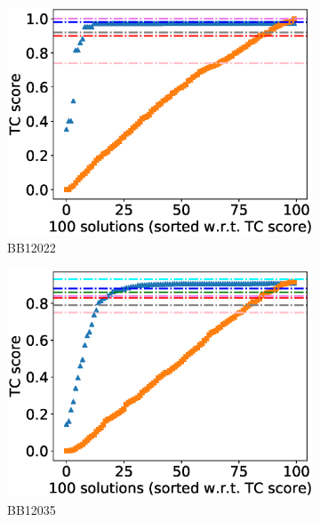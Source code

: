 \begin{figure}[!htbp]
\begin{adjustwidth}{-1cm}{-1cm}
\begin{subfigure}{0.22\textwidth}
			\includegraphics[width=\columnwidth]{Figure/summary/precomputedInit/Balibase/BB12022_tc_density_single_run_2}
			\caption{BB12022}
		\end{subfigure}
		\begin{subfigure}{0.22\textwidth}
			\includegraphics[width=\columnwidth]{Figure/summary/precomputedInit/Balibase/BB12035_tc_density_single_run_2}
			\caption{BB12035}
		\end{subfigure}
		\begin{subfigure}{0.22\textwidth}

\end{subfigure}
\end{adjustwidth}
\end{figure}

